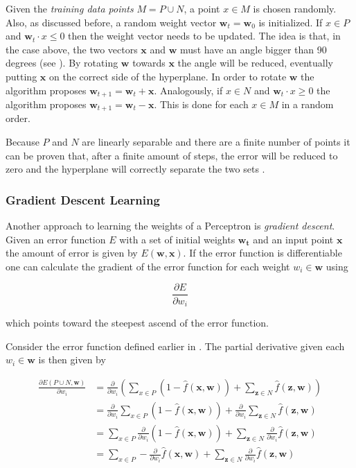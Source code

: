 Given the \textit{training data points} $M = P \cup N$, a point $x \in M$ is chosen randomly.
Also, as discussed before, a random weight vector $\bm{w}_t = \bm{w}_0$ is initialized.
If $x \in P$ and $\bm{w}_t \cdot x \leq 0$ then the weight vector needs to be updated.
The idea is that, in the case above, the two vectors $\bm{x}$ and $\bm{w}$ must have an angle bigger than 90 degrees (see ).
By rotating $\bm{w}$ towards $\bm{x}$ the angle will be reduced, eventually putting $\bm{x}$ on the correct side of the hyperplane.
In order to rotate $\bm{w}$ the algorithm proposes $\bm{w}_{t+1} = \bm{w}_{t} + \bm{x}$.
Analogously, if $x \in N$ and $\bm{w}_t \cdot x \geq 0$ the algorithm proposes $\bm{w}_{t+1} = \bm{w}_{t} - \bm{x}$.
This is done for each $x \in M$ in a random order.

Because $P$ and $N$ are linearly separable and there are a finite number of points it can be proven that, after a finite amount of steps, the error will be reduced to zero and the hyperplane will correctly separate the two sets \cite{rojas_neural_1996}.

\subsubsection{Gradient Descent Learning}

Another approach to learning the weights of a Perceptron is \textit{gradient descent}.
Given an error function $E$ with a set of initial weights $\bm{w_t}$ and an input point $\bm{x}$ the amount of error is given by $E(\bm{w}, \bm{x})$.
If the error function is differentiable one can calculate the gradient of the error function for each weight $w_i \in \bm{w}$ using

\begin{equation}
    \frac{\partial E}{\partial w_i}
\end{equation}

which points toward the steepest ascend of the error function.

Consider the error function defined earlier in .
The partial derivative given each $w_i \in \bm{w}$ is then given by

\begin{equation}
    \label{eq:error-derivative-1}
    \begin{split}
        \frac{\partial E(P \cup N, \bm{w})}{\partial w_i}
        &= \frac{\partial }{\partial w_i} \left( \sum_{x \in P} (1 - \hat{f}(\bm{x},\bm{w})) + \sum_{\bm{z} \in N} \hat{f}(\bm{z},\bm{w}) \right) \\
        &= \frac{\partial }{\partial w_i} \sum_{x \in P} (1 - \hat{f}(\bm{x},\bm{w})) + \frac{\partial }{\partial w_i} \sum_{\bm{z} \in N} \hat{f}(\bm{z},\bm{w}) \\
        &= \sum_{x \in P} \frac{\partial }{\partial w_i} (1 - \hat{f}(\bm{x},\bm{w})) + \sum_{\bm{z} \in N} \frac{\partial }{\partial w_i} \hat{f}(\bm{z},\bm{w}) \\
        &= \sum_{x \in P} - \frac{\partial }{\partial w_i} \hat{f}(\bm{x},\bm{w}) + \sum_{\bm{z} \in N} \frac{\partial }{\partial w_i} \hat{f}(\bm{z},\bm{w})
    \end{split}
\end{equation}

